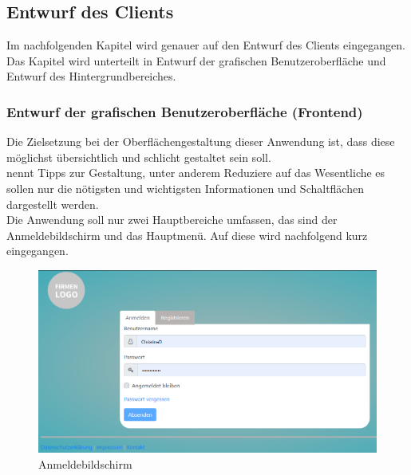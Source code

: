 \subsection{Entwurf des Clients}\label{entwurf_des_Clients}

Im nachfolgenden Kapitel wird genauer auf den Entwurf des Clients eingegangen. Das Kapitel wird unterteilt in Entwurf der grafischen Benutzeroberfläche und Entwurf des Hintergrundbereiches.

\subsubsection{Entwurf der grafischen Benutzeroberfläche (Frontend)}\label{entwurf_der_grafischen_Benutzeroberfläche_(Frontend)}
Die Zielsetzung bei der Oberflächengestaltung dieser Anwendung ist, dass diese möglichst übersichtlich und schlicht gestaltet sein soll.
\\
\cite{gui} nennt Tipps zur Gestaltung, unter anderem \grqq Reduziere auf das Wesentliche\grqq{} es sollen nur die nötigsten und wichtigsten Informationen und Schaltflächen dargestellt werden.
\\
Die Anwendung soll nur zwei Hauptbereiche umfassen, das sind der Anmeldebildschirm und das Hauptmenü. Auf diese wird nachfolgend kurz eingegangen. 

\begin{figure}[htb]
	\centering
	\includegraphics[width=1\textwidth,angle=0]{abb/login}
	\caption[Anmeldebildschirm]{Anmeldebildschirm}
	\label{fig:Anmeldebildschirm}
\end{figure}

